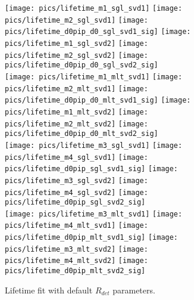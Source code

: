 \documentclass[preprint,aps,showpacs]{revtex4}
\begin{document}
\begin{figure}[htb]
\texttt{[image: pics/lifetime\_m1\_sgl\_svd1]}
\texttt{[image: pics/lifetime\_m2\_sgl\_svd1]}
\texttt{[image: pics/lifetime\_d0pip\_d0\_sgl\_svd1\_sig]}
\texttt{[image: pics/lifetime\_m1\_sgl\_svd2]}
\texttt{[image: pics/lifetime\_m2\_sgl\_svd2]}
\texttt{[image: pics/lifetime\_d0pip\_d0\_sgl\_svd2\_sig]}\\

\texttt{[image: pics/lifetime\_m1\_mlt\_svd1]}
\texttt{[image: pics/lifetime\_m2\_mlt\_svd1]}
\texttt{[image: pics/lifetime\_d0pip\_d0\_mlt\_svd1\_sig]}
\texttt{[image: pics/lifetime\_m1\_mlt\_svd2]}
\texttt{[image: pics/lifetime\_m2\_mlt\_svd2]}
\texttt{[image: pics/lifetime\_d0pip\_d0\_mlt\_svd2\_sig]}\\

\texttt{[image: pics/lifetime\_m3\_sgl\_svd1]}
\texttt{[image: pics/lifetime\_m4\_sgl\_svd1]}
\texttt{[image: pics/lifetime\_d0pip\_sgl\_svd1\_sig]}
\texttt{[image: pics/lifetime\_m3\_sgl\_svd2]}
\texttt{[image: pics/lifetime\_m4\_sgl\_svd2]}
\texttt{[image: pics/lifetime\_d0pip\_sgl\_svd2\_sig]}\\

\texttt{[image: pics/lifetime\_m3\_mlt\_svd1]}
\texttt{[image: pics/lifetime\_m4\_mlt\_svd1]}
\texttt{[image: pics/lifetime\_d0pip\_mlt\_svd1\_sig]}
\texttt{[image: pics/lifetime\_m3\_mlt\_svd2]}
\texttt{[image: pics/lifetime\_m4\_mlt\_svd2]}
\texttt{[image: pics/lifetime\_d0pip\_mlt\_svd2\_sig]}\\
\caption{Lifetime fit with default $R_{det}$ parameters.}
\label{fig:R_det_sig_sgl}
\end{figure}
\end{document}

